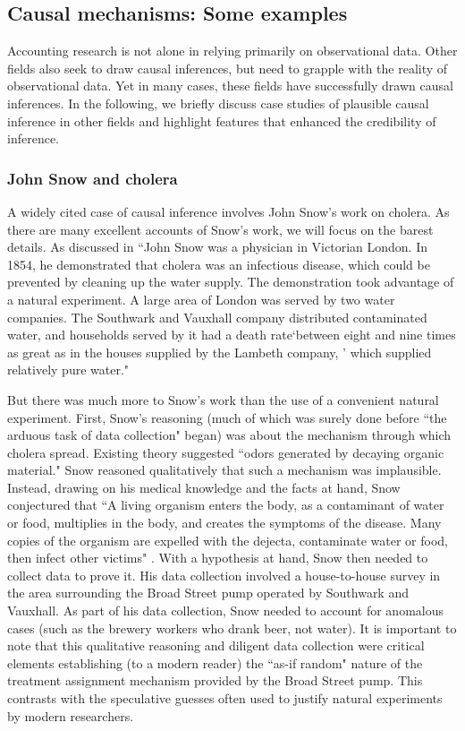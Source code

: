 \documentclass[11pt,reqno]{amsart}
\begin{document}
\subsection{Causal mechanisms: Some examples}
Accounting research is not alone in relying primarily on observational data.
Other fields also seek to draw causal inferences, but need to grapple with the reality of observational data. 
Yet in many cases, these fields have successfully drawn causal inferences.
In the following, we briefly discuss case studies of plausible causal inference in other fields and highlight features that enhanced the credibility of inference.

\subsubsection{John Snow and cholera}
A widely cited case of causal inference involves John Snow's work on cholera.
As there are many excellent accounts of Snow's work, we will focus on the barest details.
As discussed in  \citet[p.\,339]{Freedman:2009ur}
``John Snow was a physician in Victorian London.
 In 1854, he demonstrated that cholera was an infectious disease, which could be prevented by cleaning up the water supply. 
The demonstration took advantage of a natural experiment.
 A large area of London was served by two water companies. 
 The Southwark and Vauxhall company distributed contaminated water, and households served by it had a death rate`between eight and nine times as great as in the houses supplied by the Lambeth company, ' which supplied relatively pure water."

But there was much more to Snow's work than the use of a convenient natural experiment.
First, Snow's reasoning (much of which was surely done before ``the arduous task of data collection" began) was about the  mechanism through which cholera spread. Existing theory suggested ``odors generated by decaying organic material."
Snow reasoned qualitatively that such a mechanism was implausible.
Instead, drawing on his medical knowledge and the facts at hand, Snow conjectured that ``A living organism enters the body, as a contaminant of water or food, multiplies in the body, and creates the symptoms of the disease. Many copies of the organism are expelled with the dejecta, contaminate water or food, then infect other victims" \citep[p.\,342]{Freedman:2009ur}.
With a hypothesis at hand, Snow then needed to collect data to prove it.
His data collection involved a house-to-house survey in the area surrounding the Broad Street pump operated by  Southwark and Vauxhall.
As part of his data collection, Snow needed to account for anomalous cases (such as the brewery workers who drank beer, not water).
It is important to note that this qualitative reasoning and diligent data collection were critical elements establishing (to a modern reader) the ``as-if random" nature of the treatment assignment mechanism provided by the Broad Street pump.
This contrasts with the speculative guesses often used to justify natural experiments by modern researchers.
\end{document}
